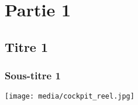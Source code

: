 \chapter{Partie 1}
\section{Titre 1}
\subsection{Sous-titre 1}

\begin{center}
\texttt{[image: media/cockpit\_reel.jpg]}
\end{center}
